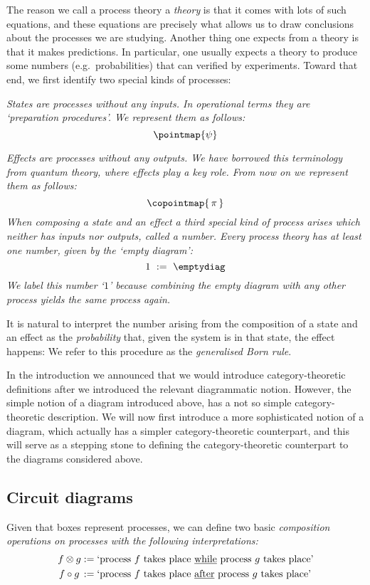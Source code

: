\documentclass[10pt]{article}
\begin{document}
The reason we call a process theory a \textit{theory} is that it comes with lots of such equations, and these equations are precisely what allows us to draw conclusions about the processes we are studying.  Another thing one expects from a theory is that it makes predictions. In particular, one usually expects a theory to produce some numbers (e.g.~probabilities) that can verified by experiments. Toward that end, we first identify two special kinds of processes:
\bit
\item \em States \em are processes without any inputs. In  operational terms they are `preparation procedures'. We represent them as follows:
\[
\pointmap{\psi}
\]
\item
\em Effects \em are processes without any outputs. We have borrowed this terminology from quantum theory, where effects play a key role.  From now on we  represent them as follows:
\[
\copointmap{\,\pi\,} 
\]
\eit
When composing a state and an effect a third special kind of process arises which neither has inputs nor outputs, called a \em number\em.  Every process theory has at least one number, given by the `empty diagram':
\[ 
1 \ :=\ \emptydiag 
\]
We label this number `$1$' because combining the empty diagram with any other process yields the same process again.

It is natural to interpret the number arising from the composition of a state and an effect as the \textit{probability} that, given the system is in that state, the effect happens: 
We refer to this procedure as the \textit{generalised Born rule}.

In the introduction we announced that we would introduce category-theoretic definitions after we introduced the relevant diagrammatic notion.  However, the simple notion of a diagram introduced above, has a not so simple category-theoretic description.  We will now first introduce a more sophisticated notion of a diagram, which actually has a simpler category-theoretic counterpart, and this will serve as a stepping stone to defining the category-theoretic counterpart to the diagrams considered above.


\subsection{Circuit diagrams}

Given that  boxes represent  processes, we can define two basic \em composition operations \em on processes with the following interpretations:
\begin{align*}
  \textrm{$f \otimes g$}
  & := 
  \textrm{`process $f$ takes place \underline{while} process $g$ takes place'} \\  
  \textrm{$f \circ g$\,}
  & :=
  \textrm{`process $f$ takes place \underline{after} process $g$ takes place'}  
\end{align*}
\end{document}
